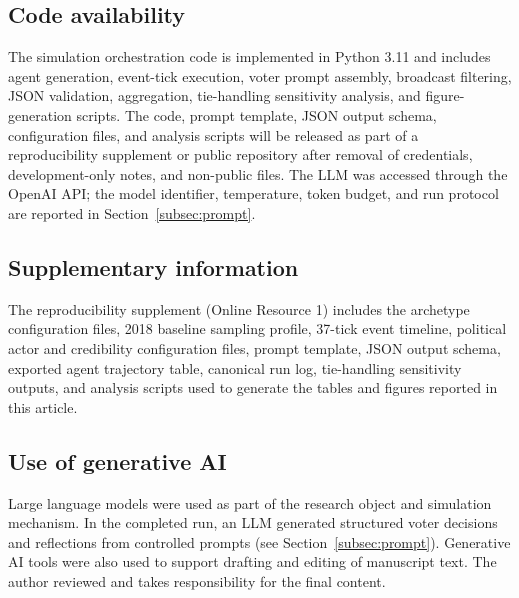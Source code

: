 \documentclass[pdflatex,sn-mathphys-num,iicol]{sn-jnl}
\begin{document}
\subsection*{Code availability}
The simulation orchestration code is implemented in Python 3.11 and includes
agent generation, event-tick execution, voter prompt assembly, broadcast
filtering, JSON validation, aggregation, tie-handling sensitivity analysis, and
figure-generation scripts. The code, prompt template, JSON output schema,
configuration files, and analysis scripts will be released as part of a
reproducibility supplement or public repository after removal of credentials,
development-only notes, and non-public files. The LLM was accessed through the
OpenAI API; the model identifier, temperature, token budget, and run protocol
are reported in Section~\ref{subsec:prompt}.

\subsection*{Supplementary information}
The reproducibility supplement (Online Resource 1) includes the archetype
configuration files, 2018 baseline sampling profile, 37-tick event timeline,
political actor and credibility configuration files, prompt template, JSON
output schema, exported agent trajectory table, canonical run log,
tie-handling sensitivity outputs, and analysis scripts used to generate the
tables and figures reported in this article.

\subsection*{Use of generative AI}
Large language models were used as part of the research object and simulation
mechanism. In the completed run, an LLM generated structured voter decisions
and reflections from controlled prompts (see Section~\ref{subsec:prompt}).
Generative AI tools were also used to support drafting and editing of manuscript
text. The author reviewed and takes responsibility for the final content.
\end{document}
